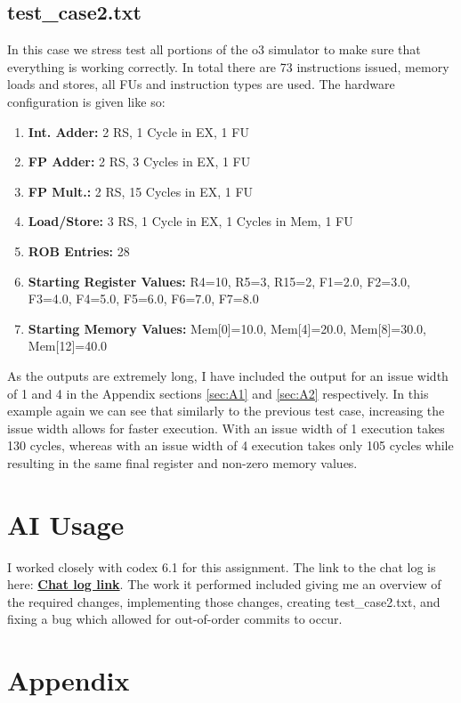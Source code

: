 \documentclass[12pt, twocolumn]{article}
\begin{document}
\subsection{test\_case2.txt}
In this case we stress test all portions of the o3 simulator to make sure that everything is working correctly. In total there are 73 instructions issued, memory loads and stores, all FUs and instruction types are used. The hardware configuration is given like so:
\begin{enumerate}[nosep, wide, labelindent=0pt]
  \item[] \textbf{Int. Adder:} 2 RS, 1 Cycle in EX, 1 FU
  \item[] \textbf{FP Adder:} 2 RS, 3 Cycles in EX, 1 FU
  \item[] \textbf{FP Mult.:} 2 RS, 15 Cycles in EX, 1 FU
  \item[] \textbf{Load/Store:} 3 RS, 1 Cycle in EX, 1 Cycles in Mem, 1 FU
  \item[] \textbf{ROB Entries:} 28
  \item[] \textbf{Starting Register Values:} R4=10, R5=3, R15=2, F1=2.0, F2=3.0, F3=4.0, F4=5.0, F5=6.0, F6=7.0, F7=8.0
  \item[] \textbf{Starting Memory Values:} Mem[0]=10.0, Mem[4]=20.0, Mem[8]=30.0, Mem[12]=40.0
\end{enumerate}

As the outputs are extremely long, I have included the output for an issue width of 1 and 4 in the Appendix sections \ref{sec:A1} and \ref{sec:A2} respectively. In this example again we can see that similarly to the previous test case, increasing the issue width allows for faster execution. With an issue width of 1 execution takes 130 cycles, whereas with an issue width of 4 execution takes only 105 cycles while resulting in the same final register and non-zero memory values. 

\section{AI Usage}
I worked closely with codex 6.1 for this assignment. The link to the chat log is here: \href{https://chatgpt.com/s/cx_6ade5a9f63bc8191a601af9cf74f6afb}{\textbf{Chat log link}}. The work it performed included giving me an overview of the required changes, implementing those changes, creating test\_case2.txt, and fixing a bug which allowed for out-of-order commits to occur.

\FloatBarrier
\onecolumn
\section{Appendix}
\end{document}
